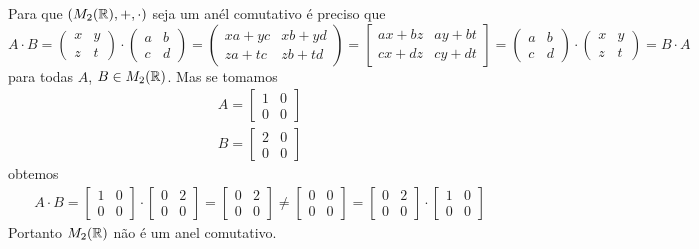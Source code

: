 \documentclass[12pt]{exam}
\begin{document}
Para que $(M_2(\mathbb{R}), + , \cdot)$ seja um an\'el comutativo \'e preciso que
\[
    A\cdot B = \begin{pmatrix}
        x & y\\z & t 
    \end{pmatrix} \cdot \begin{pmatrix}
        a & b\\c & d 
    \end{pmatrix} = \begin{pmatrix}
        xa + yc & xb + yd\\za + tc & zb + td 
    \end{pmatrix} = \begin{bmatrix}
        ax + bz & ay + bt\\
        cx + dz & cy + dt
    \end{bmatrix} = \begin{pmatrix}
        a & b\\c & d 
    \end{pmatrix}\cdot \begin{pmatrix}
        x & y\\z & t 
    \end{pmatrix} = B \cdot A
\]
para todas $A$, $B \in M_2(\mathbb{R})$. Mas se tomamos
\begin{align*}
    A = \begin{bmatrix}
        1 & 0\\
        0 & 0
    \end{bmatrix}\\
    B = \begin{bmatrix}
        2 & 0\\
        0 & 0
    \end{bmatrix}
\end{align*}
obtemos
\begin{align*}
    A \cdot B = \begin{bmatrix}
        1 & 0\\
        0 & 0
    \end{bmatrix}\cdot \begin{bmatrix}
        0 & 2\\
        0 & 0
    \end{bmatrix} = \begin{bmatrix}
        0 & 2\\
        0 & 0
    \end{bmatrix} \ne \begin{bmatrix}
        0 & 0\\
        0 & 0
    \end{bmatrix} = \begin{bmatrix}
        0 & 2\\
        0 & 0
    \end{bmatrix}\cdot \begin{bmatrix}
        1 & 0\\
        0 & 0
    \end{bmatrix}
\end{align*}
Portanto $M_2(\mathbb{R})$ n\~ao \'e um anel comutativo.
\end{document}
